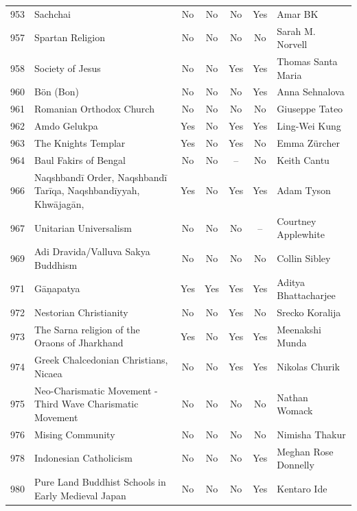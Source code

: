 {\begin{longtable}{rp{3.5cm}ccccp{3cm}}
953 & {\raggedright Sachchai} & No & No & No & Yes & {\raggedright Amar BK} \\
957 & {\raggedright Spartan Religion} & No & No & No & No & {\raggedright Sarah M. Norvell} \\
958 & {\raggedright Society of Jesus} & No & No & Yes & Yes & {\raggedright Thomas Santa Maria} \\
960 & {\raggedright Bön (Bon)} & No & No & No & Yes & {\raggedright Anna Sehnalova} \\
961 & {\raggedright Romanian Orthodox Church} & No & No & No & No & {\raggedright Giuseppe Tateo} \\
962 & {\raggedright Amdo Gelukpa} & Yes & No & Yes & Yes & {\raggedright Ling-Wei Kung} \\
963 & {\raggedright The Knights Templar} & Yes & No & Yes & No & {\raggedright Emma Zürcher} \\
964 & {\raggedright Baul Fakirs of Bengal} & No & No & -- & No & {\raggedright Keith Cantu} \\
966 & {\raggedright Naqshbandī Order, Naqshbandī Tarīqa, Naqshbandīyyah, Khwājagān,} & Yes & No & Yes & Yes & {\raggedright Adam Tyson} \\
967 & {\raggedright Unitarian Universalism} & No & No & No & -- & {\raggedright Courtney Applewhite} \\
969 & {\raggedright Adi Dravida/Valluva Sakya Buddhism} & No & No & No & No & {\raggedright Collin Sibley} \\
971 & {\raggedright Gāṇapatya} & Yes & Yes & Yes & Yes & {\raggedright Aditya Bhattacharjee} \\
972 & {\raggedright Nestorian Christianity} & No & No & Yes & No & {\raggedright Srecko Koralija} \\
973 & {\raggedright The Sarna religion of the Oraons of Jharkhand} & Yes & No & Yes & Yes & {\raggedright Meenakshi Munda} \\
974 & {\raggedright Greek Chalcedonian Christians, Nicaea} & No & No & Yes & Yes & {\raggedright Nikolas Churik} \\
975 & {\raggedright Neo-Charismatic Movement - Third Wave Charismatic Movement} & No & No & No & No & {\raggedright Nathan Womack} \\
976 & {\raggedright Mising Community} & No & No & No & No & {\raggedright Nimisha Thakur} \\
978 & {\raggedright Indonesian Catholicism} & No & No & No & Yes & {\raggedright Meghan Rose Donnelly} \\
980 & {\raggedright Pure Land Buddhist Schools in Early Medieval Japan} & No & No & No & Yes & {\raggedright Kentaro Ide} \\

\end{longtable}}
